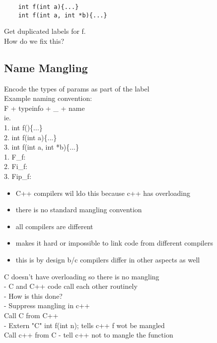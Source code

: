 \documentclass[12pt]{article}
\begin{document}
	\begin{verbatim}
	int f(int a){...}
	int f(int a, int *b){...}
	\end{verbatim}
	
	Get duplicated labels for f.\\
	How do we fix this?\\
	
	\subsection*{Name Mangling}
	Encode the types of params as part of the label\\
	
	Example naming convention:\\
	F + typeinfo + \_ + name\\
	ie.\\
	1. int f()\{...\}\\
	2. int f(int a)\{...\}\\
	3. int f(int a, int *b)\{...\}\\
	
	1. F\_f:\\
	2. Fi\_f:\\
	3. Fip\_f:\\
	
	
	\begin{itemize}
		\item C++ compilers wil ldo this because c++ has overloading
		\item there is no standard mangling convention
		\item all compilers are different
		\item makes it hard or  impossible to link code from different compilers
		\item this is by design b/c compilers differ in other aspects as well
	\end{itemize}
	
	C doesn't have overloading so there is no mangling\\
	- C and C++ code call each other routinely\\
	- How is this done?\\
	- Suppress mangling in c++\\
	Call C from C++\\
	- Extern "C" int f(int n); tells c++ f wot be mangled\\
	
	Call c++ from C - tell c++ not to mangle the function\\
	
\end{document}
